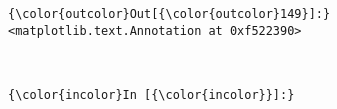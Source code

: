 \documentclass{article}
\begin{document}
            \begin{Verbatim}[commandchars=\\\{\}]
{\color{outcolor}Out[{\color{outcolor}149}]:} <matplotlib.text.Annotation at 0xf522390>
\end{Verbatim}
        
    \begin{center}
    \end{center}
    { \hspace*{\fill} \\}
    
    \begin{Verbatim}[commandchars=\\\{\}]
{\color{incolor}In [{\color{incolor}}]:} 
\end{Verbatim}


    
    
    
    
\end{document}
